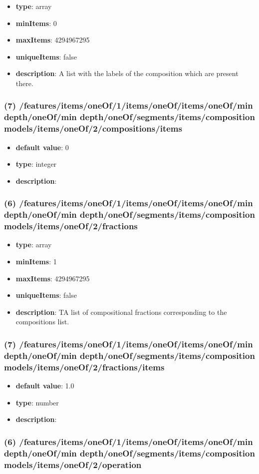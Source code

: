 \begin{itemize}[leftmargin=6em]\item {\bf type}: array
\item {\bf minItems}: 0
\item {\bf maxItems}: 4294967295
\item {\bf uniqueItems}: false
\item {\bf description}: A list with the labels of the composition which are present there.
\end{itemize}\subsubsection{(7) /features/items/oneOf/1/items/oneOf/items/oneOf/min depth/oneOf/min depth/oneOf/segments/items/composition models/items/oneOf/2/compositions/items}
\begin{itemize}[leftmargin=7em]\item {\bf default value}: 0
\item {\bf type}: integer
\item {\bf description}: 
\end{itemize}\subsubsection{(6) /features/items/oneOf/1/items/oneOf/items/oneOf/min depth/oneOf/min depth/oneOf/segments/items/composition models/items/oneOf/2/fractions}
\begin{itemize}[leftmargin=6em]\item {\bf type}: array
\item {\bf minItems}: 1
\item {\bf maxItems}: 4294967295
\item {\bf uniqueItems}: false
\item {\bf description}: TA list of compositional fractions corresponding to the compositions list.
\end{itemize}\subsubsection{(7) /features/items/oneOf/1/items/oneOf/items/oneOf/min depth/oneOf/min depth/oneOf/segments/items/composition models/items/oneOf/2/fractions/items}
\begin{itemize}[leftmargin=7em]\item {\bf default value}: 1.0
\item {\bf type}: number
\item {\bf description}: 
\end{itemize}\subsubsection{(6) /features/items/oneOf/1/items/oneOf/items/oneOf/min depth/oneOf/min depth/oneOf/segments/items/composition models/items/oneOf/2/operation}
